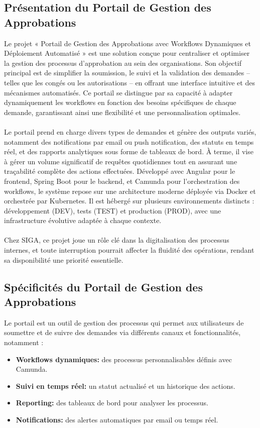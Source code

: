 \subsection{Présentation du Portail de Gestion des Approbations}
Le projet « Portail de Gestion des Approbations avec Workflows Dynamiques et Déploiement Automatisé » est une solution conçue pour centraliser et optimiser la gestion des processus d’approbation au sein des organisations. Son objectif principal est de simplifier la soumission, le suivi et la validation des demandes – telles que les congés ou les autorisations – en offrant une interface intuitive et des mécanismes automatisés. Ce portail se distingue par sa capacité à adapter dynamiquement les workflows en fonction des besoins spécifiques de chaque demande, garantissant ainsi une flexibilité et une personnalisation optimales.\\
\\
    \newpage
Le portail prend en charge divers types de demandes et génère des outputs variés, notamment des notifications par email ou push notification, des statuts en temps réel, et des rapports analytiques sous forme de tableaux de bord. À terme, il vise à gérer un volume significatif de requêtes quotidiennes tout en assurant une traçabilité complète des actions effectuées. Développé avec Angular pour le frontend, Spring Boot pour le backend, et Camunda pour l’orchestration des workflows, le système repose sur une architecture moderne déployée via Docker et orchestrée par Kubernetes. Il est hébergé sur plusieurs environnements distincts : développement (DEV), tests (TEST) et production (PROD), avec une infrastructure évolutive adaptée à chaque contexte.\\
\\
Chez SIGA, ce projet joue un rôle clé dans la digitalisation des processus internes, et toute interruption pourrait affecter la fluidité des opérations, rendant sa disponibilité une priorité essentielle.

\subsection{Spécificités du Portail de Gestion des Approbations}
Le portail est un outil de gestion des processus qui permet aux utilisateurs de soumettre et de suivre des demandes via différents canaux et fonctionnalités, notamment : \begin{itemize}
    \item \textbf{Workflows dynamiques: }des processus personnalisables définis avec Camunda.
    \item \textbf{Suivi en temps réel: }un statut actualisé et un historique des actions.
    \item \textbf{Reporting: }des tableaux de bord pour analyser les processus.
    \item \textbf{Notifications: }des alertes automatiques par email ou temps réel.
\end{itemize}
